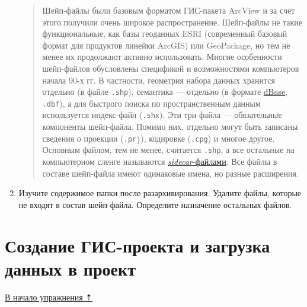 \documentclass[
  12pt,
]{book}
\begin{document}
\begin{enumerate}
  \begin{quote}
  Шейп-файлы были базовым форматом ГИС-пакета ArcView и за счёт этого получили очень широкое распространение. Шейп-файлы не такие функциональные, как базы геоданных ESRI (современный базовый формат для продуктов линейки ArcGIS) или GeoPackage, но тем не менее их продолжают активно использовать. Многие особенности шейп-файлов обусловлены спецификой и возможностями компьютеров начала 90-х гг. В частности, геометрия набора данных хранится отдельно (в файле \texttt{.shp}), семантика --- отдельно (в формате \href{https://en.wikipedia.org/wiki/DBase}{dBase}, \texttt{.dbf}), а для быстрого поиска по пространственным данным используется индекс-файл (\texttt{.shx}). Эти три файла --- обязательные компоненты шейп-файла. Помимо них, отдельно могут быть записаны сведения о проекции (\texttt{.prj}), кодировке (\texttt{.cpg}) и многое другое. Основным файлом, тем не менее, считается \texttt{.shp}, а все остальные на компьютерном сленге называются \href{https://en.wikipedia.org/wiki/Sidecar_file}{\emph{sidecar}-файлами}. Все файлы в составе шейп-файла имеют одинаковые имена, но разные расширения.
  \end{quote}
\item
  Изучите содержимое папки после разархивирования. Удалите файлы, которые не входят в состав шейп-файла. Определите назначение остальных файлов.
\end{enumerate}

\hypertarget{map-design-world-qgis-project}{%
\section{Создание ГИС-проекта и загрузка данных в проект}\label{map-design-world-qgis-project}}

\protect\hyperlink{map-design-world}{В начало упражнения ⇡}
\end{document}
